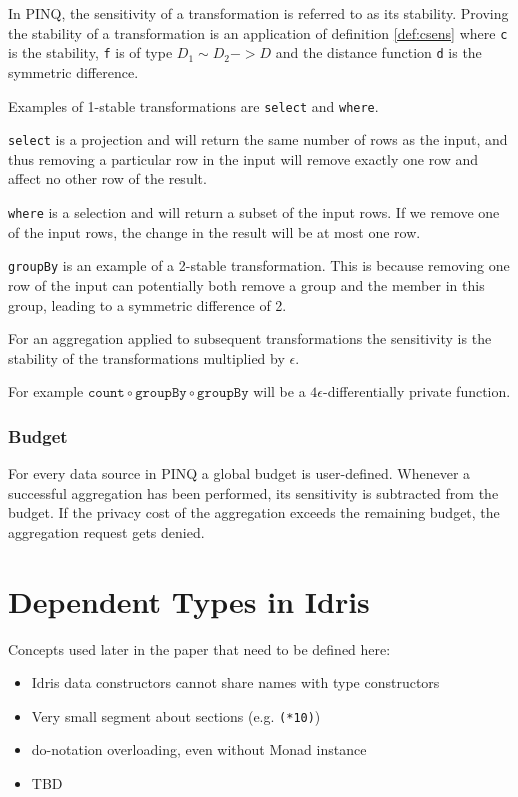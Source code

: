\documentclass[12pt]{article}
\begin{document}
In PINQ, the sensitivity of a transformation is referred to as its stability.
Proving the stability of a transformation is an application of definition \ref{def:csens} where \texttt{c} is the stability, \texttt{f} is of type  $D_1 \sim D_2 -> D$ and the distance function \texttt{d} is the symmetric difference.

Examples of 1-stable transformations are \texttt{select} and \texttt{where}.

\texttt{select} is a projection and will return the same number of rows as the input, and thus removing a particular row in the input will remove exactly one row and affect no other row of the result.

\texttt{where} is a selection and will return a subset of the input rows.
If we remove one of the input rows, the change in the result will be at most one row.

\texttt{groupBy} is an example of a 2-stable transformation.
This is because removing one row of the input can potentially both remove a group and the member in this group, leading to a symmetric difference of 2.

For an aggregation applied to subsequent transformations the sensitivity is the stability of the transformations multiplied by $\epsilon$.

For example $\texttt{count} \circ \texttt{groupBy} \circ \texttt{groupBy}$ will be a $4\epsilon$-differentially private function.

\subsubsection{Budget}

For every data source in PINQ a global budget is user-defined.
Whenever a successful aggregation has been performed, its sensitivity is subtracted from the budget.
If the privacy cost of the aggregation exceeds the remaining budget, the aggregation request gets denied.

\section{Dependent Types in Idris}\label{sec:dependent_types_in_idris}

Concepts used later in the paper that need to be defined here:
\begin{itemize}
\item Idris data constructors cannot share names with type constructors
\item Very small segment about sections (e.g. \texttt{(*10)})
\item do-notation overloading, even without Monad instance
\item TBD
\end{itemize}
\end{document}
